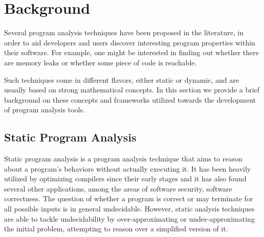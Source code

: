 
\newcommand{\args}[1]{\textcolor{Bittersweet}{\small{#1}}}

\newcommand{\relname}[1]{\textcolor{NavyBlue}{\textsc{\small{#1}}}}
\newcommand{\rel}[2]{\texttt{\relname{#1}(\args{#2})}}

\newcommand{\altrelname}[1]{\textsc{\underline{#1}}}
\newcommand{\altrel}[2]{\altrelname{#1} (\args{#2})}

\newcommand{\consname}[1]{\textsc{\textbf{\relname{#1}}}}
\newcommand{\consapp}[2]{\consname{#1} (\args{#2})}
\newcommand{\cons}[3]{\consapp{#1}{#2} = \textbf{\args{#3}}}

\newcommand{\dl}[1]{{\texttt{#1}}}
\newcommand{\rulearrow}{\large{:-}}
\newcommand{\ruleforall}{{\large{\textbf{$\implies$}}}}

\chapter{Background}\label{c:background}

Several program analysis techniques have been proposed in the literature, in
order to aid developers and users discover interesting program properties within
their software. For example, one might be interested in finding out whether
there are memory leaks or whether some piece of code is reachable.

Such techniques come in different flavors, either static or dynamic, and are
usually based on strong mathematical concepts. In this section we provide
a brief background on these concepts and frameworks utilized towards
the development of program analysis tools.

\section{Static Program Analysis}

Static program analysis is a program analysis technique that aims to reason
about a program's behaviors without actually executing it. It has been
heavily utilized by optimizing compilers since their early stages and it
has also found several other applications, among the areas of software security,
software correctness\cite{spa}. The question of whether
a program is correct or may terminate for all possible inputs is in general
undecidable. However, static analysis techniques are able to tackle
undecidability by over-approximating or under-approximating the initial problem,
attempting to reason over a simplified version of it.


